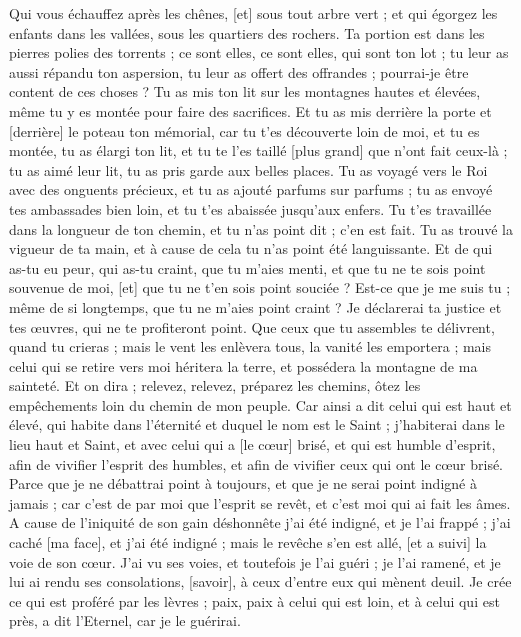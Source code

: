 \begin{multicols}{2}
Qui vous échauffez après les chênes, [et] sous tout arbre vert ; et qui égorgez les enfants dans les vallées, sous les quartiers des rochers.
Ta portion est dans les pierres polies des torrents ; ce sont elles, ce sont elles, qui sont ton lot ; tu leur as aussi répandu ton aspersion, tu leur as offert des offrandes ; pourrai-je être content de ces choses ?
Tu as mis ton lit sur les montagnes hautes et élevées, même tu y es montée pour faire des sacrifices.
Et tu as mis derrière la porte et [derrière] le poteau ton mémorial, car tu t'es découverte loin de moi, et tu es montée, tu as élargi ton lit, et tu te l'es taillé [plus grand] que n'ont fait ceux-là ; tu as aimé leur lit, tu as pris garde aux belles places.
Tu as voyagé vers le Roi avec des onguents précieux, et tu as ajouté parfums sur parfums ; tu as envoyé tes ambassades bien loin, et tu t'es abaissée jusqu'aux enfers.
Tu t'es travaillée dans la longueur de ton chemin, et tu n'as point dit ; c'en est fait. Tu as trouvé la vigueur de ta main, et à cause de cela tu n'as point été languissante.
Et de qui as-tu eu peur, qui as-tu craint, que tu m'aies menti, et que tu ne te sois point souvenue de moi, [et] que tu ne t'en sois point souciée ? Est-ce que je me suis tu ; même de si longtemps, que tu ne m'aies point craint ?
Je déclarerai ta justice et tes œuvres, qui ne te profiteront point.
Que ceux que tu assembles te délivrent, quand tu crieras ; mais le vent les enlèvera tous, la vanité les emportera ; mais celui qui se retire vers moi héritera la terre, et possédera la montagne de ma sainteté.
Et on dira ; relevez, relevez, préparez les chemins, ôtez les empêchements loin du chemin de mon peuple.
Car ainsi a dit celui qui est haut et élevé, qui habite dans l'éternité et duquel le nom est le Saint ; j'habiterai dans le lieu haut et Saint, et avec celui qui a [le cœur] brisé, et qui est humble d'esprit, afin de vivifier l'esprit des humbles, et afin de vivifier ceux qui ont le cœur brisé.
Parce que je ne débattrai point à toujours, et que je ne serai point indigné à jamais ; car c'est de par moi que l'esprit se revêt, et c'est moi qui ai fait les âmes.
A cause de l'iniquité de son gain déshonnête j'ai été indigné, et je l'ai frappé ; j'ai caché [ma face], et j'ai été indigné ; mais le revêche s'en est allé, [et a suivi] la voie de son cœur.
J'ai vu ses voies, et toutefois je l'ai guéri ; je l'ai ramené, et je lui ai rendu ses consolations, [savoir], à ceux d'entre eux qui mènent deuil.
Je crée ce qui est proféré par les lèvres ; paix, paix à celui qui est loin, et à celui qui est près, a dit l'Eternel, car je le guérirai.

\end{multicols}
